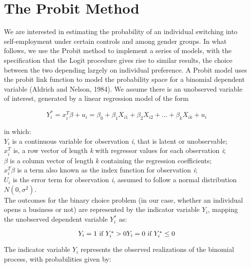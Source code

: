 \section{The Probit Method}

We are interested in estimating the probability of an individual switching into self-employment under certain controls and among gender groups. In what follows, we use the Probit method to implement a series of models, with the specification that the Logit  procedure gives rise to similar results, the choice between the two depending largely on individual preference. A Probit model uses the probit link function to model the probability space for a binomial dependent variable (Aldrich and Nelson, 1984). We assume there is an unobserved variable of interest, generated by a linear regression model of the form


\begin{dmath}
\mbox{$Y^{*}_{i} = x^{T}_i\beta + u_i = \beta_0 + \beta_1X_{i1} + \beta_2X_{i2} + ... + \beta_kX_{ik} + u_i$}
\end{dmath}

in which: \\

$Y_i$ is a continuous variable for observation \textit{i}, that is latent or unobservable; \\
$x^T_i$ is, a row vector of length \textit{k} with regressor values for each observation \textit{i}; \\ 
$\beta$ is a column vector of length \textit{k} containing the regression coefficients; \\
$x^T_i\beta$ is a term also known as the index function for observation \textit{i}; \\
$U_i$ is the error term for observation \textit{i}, assumed to follow a normal distribution $N(0, \sigma^2)$. \\

The outcomes for the binary choice problem (in our case, whether an individual opens a business or not) are represented by the indicator variable $Y_i$, mapping the unobserved dependent variable $Y^*_i$ as:



\begin{dmath}
\mbox{$Y_i = 1 \mbox{ if } Y^{*}_{i}>0$} \\
\mbox{$Y_i = 0 \mbox{ if } Y^*_i\leq 0$}
\end{dmath}

The indicator variable $Y_i$ represents the observed realizations of the binomial process, with probabilities given by:

